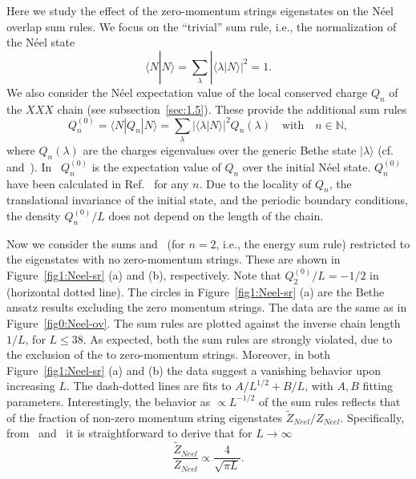 \documentclass[11pt]{iopart}
\begin{document}
Here we study the effect of the zero-momentum strings eigenstates on the 
N\'eel overlap sum rules. We focus on the ``trivial'' sum rule, i.e., the 
normalization of the N\'eel state  
%
\begin{equation}
\label{sr-trivial}
\langle N|N\rangle=\sum\limits_{\lambda}|\langle\lambda|N\rangle|^2=1. 
\end{equation}
%
We also consider the N\'eel expectation value of the local conserved charge 
$Q_n$ of the $XXX$ chain (see subsection~\ref{sec:1.5}). These provide the 
additional sum rules
%
\begin{equation}
\label{sr-charge}
Q_n^{(0)}=\langle N|Q_n|N\rangle=\sum\limits_{\lambda}|\langle\lambda|N\rangle|^2
Q_{n}(\lambda)\quad\textrm{with}\quad n\in\mathbb{N}, 
\end{equation}
%
where $Q_n(\lambda)$ are the charges eigenvalues over the generic Bethe state 
$|\lambda\rangle$ (cf.~ and~). 
%
In~ $Q_n^{(0)}$ is the expectation value of $Q_n$ over the 
initial N\'eel state. $Q_n^{(0)}$ have been calculated in Ref.~\cite{fagotti-2013} 
for any $n$. Due to the locality of $Q_n$, the translational invariance of the initial 
state, and the periodic boundary conditions, the density $Q_n^{(0)}/L$ does 
not depend on the length of the chain. 

Now we consider the sums  and~ (for $n=2$, i.e., the energy sum rule)
restricted to the eigenstates with no zero-momentum strings.
These are shown in Figure~\ref{fig1:Neel-sr} (a) and (b), respectively. 
Note that $Q^{(0)}_2/L=-1/2$ in~ (horizontal dotted line). 
The circles in Figure~\ref{fig1:Neel-sr} (a) are the Bethe ansatz results excluding 
the zero momentum strings. The data are the same as in Figure~\ref{fig0:Neel-ov}. 
The sum rules are plotted against the inverse chain length $1/L$, for $L\le 38$. 
%
As expected, both the sum rules are strongly violated, due to the exclusion of the to zero-momentum 
strings. Moreover, in both Figure~\ref{fig1:Neel-sr} (a) and (b) the data suggest a 
vanishing behavior upon increasing $L$. The dash-dotted lines are fits to  $A/L^{1/2}
+B/L$, with $A,B$ fitting parameters. Interestingly, the behavior as $\propto 
L^{-1/2}$ of the sum rules reflects that of the fraction of non-zero momentum string 
eigenstates $\widetilde Z_{Neel}/Z_{Neel}$. Specifically, from~ and~ 
it is straightforward to derive that for $L\to\infty$
%
\begin{equation}
\label{beh}
\frac{\widetilde Z_{Neel}}{Z_{Neel}}\propto\frac{4}{\sqrt{\pi L}}. 
\end{equation}
% 
\end{document}
